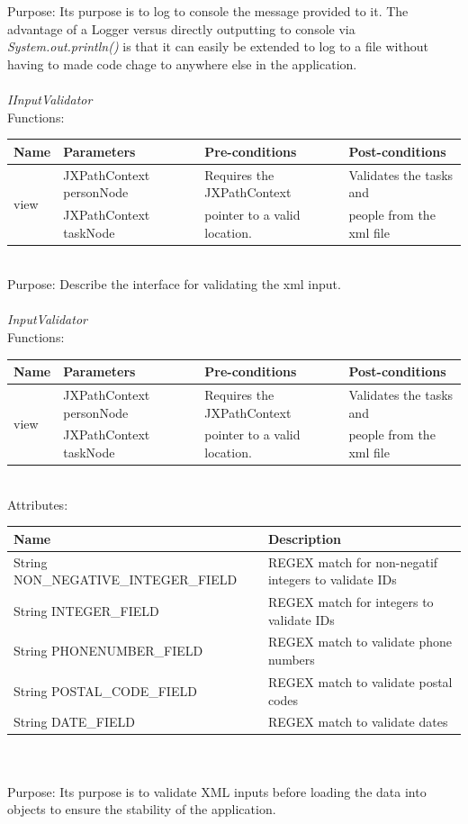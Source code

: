 Purpose: Its purpose is to log to console the message provided to it. The advantage of a Logger versus directly outputting to console via \emph{System.out.println()} is that it can easily be extended to log to a file without having to made code chage to anywhere else in the application.
\\
\\
\emph{IInputValidator}\\
Functions:\\
\begin{tabular}{| l | l | l | l |}
\hline
Name & Parameters & Pre-conditions & Post-conditions\\
\hline
\multirow{2}{*}{view} & JXPathContext personNode       & Requires the JXPathContext	&  Validates the tasks and\\							
			 & JXPathContext taskNode           & pointer to a valid location.        & people from the xml file
\\
\hline
\end{tabular}
\\

Purpose: Describe the interface for validating the xml input.
\\
\\
\emph{InputValidator}\\
Functions:\\
\begin{tabular}{| l | l | l | l |}
\hline
Name & Parameters & Pre-conditions & Post-conditions\\
\hline
\multirow{2}{*}{view} & JXPathContext personNode       & Requires the JXPathContext	&  Validates the tasks and\\							
			 & JXPathContext taskNode           & pointer to a valid location.        & people from the xml file
\\
\hline
\end{tabular}
\\

Attributes:\\
\begin{tabular}{| l | l |}
\hline
 Name                                                        & Description\\
\hline
String NON\_NEGATIVE\_INTEGER\_FIELD  & REGEX match for non-negatif integers to validate IDs\\
\hline
String INTEGER\_FIELD                               & REGEX match for integers to validate IDs\\
\hline
String PHONENUMBER\_FIELD                    & REGEX match to validate phone numbers\\
\hline
String POSTAL\_CODE\_FIELD                    &  REGEX match to validate postal codes\\
\hline
String DATE\_FIELD                                    &  REGEX match to validate dates\\
\hline
\end{tabular}\\
\\

Purpose: Its purpose is to validate XML inputs before loading the data into objects to ensure the stability of the application.
\\
\\